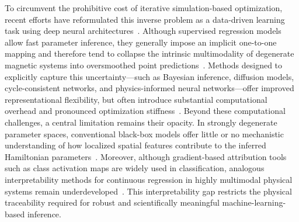 \documentclass[final,5p,times,twocolumn]{elsarticle}
\begin{document}
To circumvent the prohibitive cost of iterative simulation-based optimization, recent efforts have reformulated this inverse problem as a data-driven learning task using deep neural architectures~\cite{lee2024deep}. Although supervised regression models allow fast parameter inference, they generally impose an implicit one-to-one mapping and therefore tend to collapse the intrinsic multimodality of degenerate magnetic systems into oversmoothed point predictions~\cite{chen2024data}. Methods designed to explicitly capture this uncertainty—such as Bayesian inference, diffusion models, cycle-consistent networks, and physics-informed neural networks—offer improved representational flexibility, but often introduce substantial computational overhead and pronounced optimization stiffness~\cite{lan2022scaling, huang2023cycle, baldan2023physics}. Beyond these computational challenges, a central limitation remains their opacity. In strongly degenerate parameter spaces, conventional black-box models offer little or no mechanistic understanding of how localized spatial features contribute to the inferred Hamiltonian parameters~\cite{wang2021learning, vcadevz2026neural}. Moreover, although gradient-based attribution tools such as class activation maps are widely used in classification, analogous interpretability methods for continuous regression in highly multimodal physical systems remain underdeveloped~\cite{he2022survey}. This interpretability gap restricts the physical traceability required for robust and scientifically meaningful machine-learning-based inference.
\end{document}
